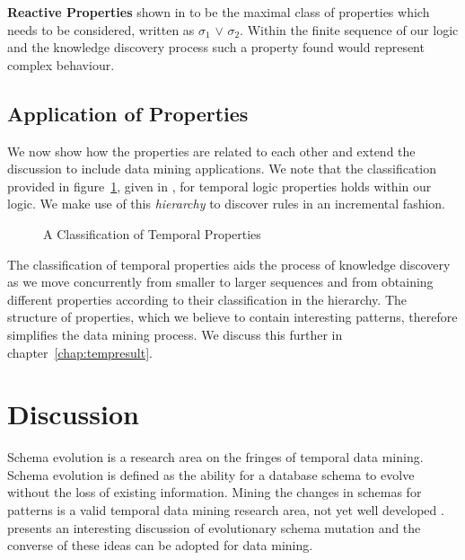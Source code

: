 { \bf Reactive Properties} shown in \cite{mp92} to be the maximal
class of properties which needs to be considered, written as
 $\sigma_1$ $\vee$  $\sigma_2$. Within the
finite sequence of our logic and the knowledge discovery process such
a property found would represent complex behaviour.


\subsection{Application of Properties}

We now show how the properties are related to each other and extend
the discussion to include data mining applications. We note that
the classification provided in figure~\ref{fig:Classification}, given
in \cite{mp92}, for temporal logic properties holds within our logic. We make use of this {\em hierarchy} to discover rules in
an incremental fashion.

\begin{figure}[ht]
\centerline{}
\caption{\label{fig:Classification} A Classification of Temporal
Properties}
\end{figure}

The classification of temporal properties aids the process of
knowledge discovery as we move concurrently from smaller to larger
sequences and from obtaining different properties according to their
classification in the hierarchy. The structure of properties, which we
believe to contain interesting patterns, therefore simplifies the data
mining process. We discuss this further in chapter~\ref{chap:tempresult}.

\section{Discussion}\label{sec:tl_disc}

Schema evolution \cite{rod94} is a research area on the fringes of
temporal data mining. Schema evolution is defined as the ability for a
database schema to evolve without the loss of existing
information. Mining the changes in schemas for patterns is a valid
temporal data mining research area, not yet well developed \cite{hk98}.
\cite{van93} presents an interesting discussion of evolutionary schema
mutation and the converse of these ideas can be adopted for data mining.
\medskip

